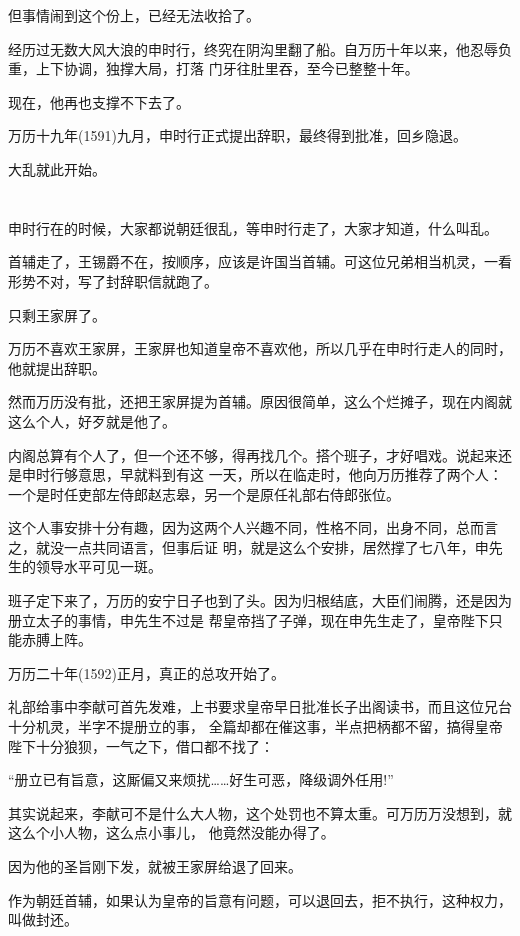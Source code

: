 \documentclass[11pt,a4paper,onecolumn]{article}
\begin{document}
但事情闹到这个份上，已经无法收拾了。

经历过无数大风大浪的申时行，终究在阴沟里翻了船。自万历十年以来，他忍辱负重，上下协调，独撑大局，打落
门牙往肚里吞，至今已整整十年。

现在，他再也支撑不下去了。

万历十九年(1591)九月，申时行正式提出辞职，最终得到批准，回乡隐退。

大乱就此开始。

\section[\thesection]{}

申时行在的时候，大家都说朝廷很乱，等申时行走了，大家才知道，什么叫乱。

首辅走了，王锡爵不在，按顺序，应该是许国当首辅。可这位兄弟相当机灵，一看形势不对，写了封辞职信就跑了。

只剩王家屏了。

万历不喜欢王家屏，王家屏也知道皇帝不喜欢他，所以几乎在申时行走人的同时，他就提出辞职。

然而万历没有批，还把王家屏提为首辅。原因很简单，这么个烂摊子，现在内阁就这么个人，好歹就是他了。

内阁总算有个人了，但一个还不够，得再找几个。搭个班子，才好唱戏。说起来还是申时行够意思，早就料到有这
一天，所以在临走时，他向万历推荐了两个人：一个是时任吏部左侍郎赵志皋，另一个是原任礼部右侍郎张位。

这个人事安排十分有趣，因为这两个人兴趣不同，性格不同，出身不同，总而言之，就没一点共同语言，但事后证
明，就是这么个安排，居然撑了七八年，申先生的领导水平可见一斑。

班子定下来了，万历的安宁日子也到了头。因为归根结底，大臣们闹腾，还是因为册立太子的事情，申先生不过是
帮皇帝挡了子弹，现在申先生走了，皇帝陛下只能赤膊上阵。

万历二十年(1592)正月，真正的总攻开始了。

礼部给事中李献可首先发难，上书要求皇帝早日批准长子出阁读书，而且这位兄台十分机灵，半字不提册立的事，
全篇却都在催这事，半点把柄都不留，搞得皇帝陛下十分狼狈，一气之下，借口都不找了：

``册立已有旨意，这厮偏又来烦扰……好生可恶，降级调外任用!''

其实说起来，李献可不是什么大人物，这个处罚也不算太重。可万历万没想到，就这么个小人物，这么点小事儿，
他竟然没能办得了。

因为他的圣旨刚下发，就被王家屏给退了回来。

作为朝廷首辅，如果认为皇帝的旨意有问题，可以退回去，拒不执行，这种权力，叫做封还。
\end{document}
